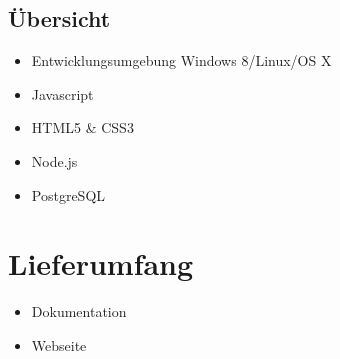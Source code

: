 \documentclass[a4paper,bibtotoc,oneside]{scrartcl}	%
\begin{document}
\subsection{Übersicht}
	\begin{itemize}
		\item Entwicklungsumgebung Windows 8/Linux/OS X
		\item Javascript
		\item HTML5 \& CSS3
		\item Node.js
		\item PostgreSQL
	\end{itemize}

\section{Lieferumfang}
	\begin{itemize}
		\item Dokumentation
		\item Webseite
	\end{itemize}
\newpage
\listoffigures
{}


\end{document}
